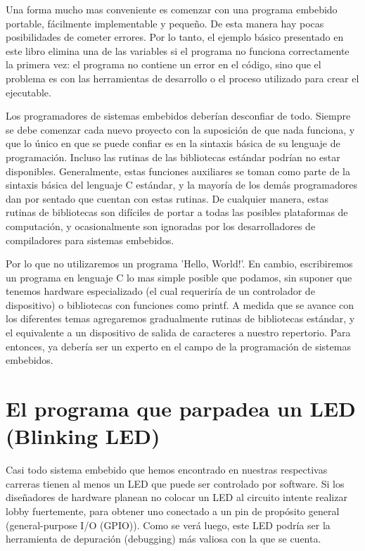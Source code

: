 \documentclass[output=paper, 
colorlinks,
citecolor=brown,
newtxmath
]{langscibook}
\begin{document}
Una forma mucho mas conveniente es comenzar con una programa embebido portable,
fácilmente implementable y pequeño. De esta manera hay pocas posibilidades de
cometer errores. Por lo tanto, el ejemplo básico presentado en este libro elimina
una de las variables si el programa no funciona correctamente la primera vez:
el programa no contiene un error en el código, sino que el problema es con las
herramientas de desarrollo o el proceso utilizado para crear el ejecutable.


Los programadores de sistemas embebidos deberían desconfiar de todo. Siempre se debe comenzar cada nuevo proyecto con la 
suposición de que nada funciona, y que lo único en que se puede confiar 
es en la sintaxis básica de su lenguaje de programación.
Incluso las rutinas de las bibliotecas estándar podrían no estar disponibles.
Generalmente, estas funciones auxiliares se toman como parte de la
sintaxis básica del lenguaje C estándar, y la mayoría de los demás programadores dan por sentado que cuentan con estas rutinas. De cualquier manera, 
estas rutinas de bibliotecas son difíciles de portar a todas las posibles
plataformas de computación, y ocasionalmente son ignoradas
por los desarrolladores de compiladores para sistemas embebidos.

Por lo que no utilizaremos un programa 'Hello, World!'. En cambio, escribiremos
un programa en lenguaje C lo mas simple posible que podamos, sin suponer
que tenemos hardware especializado (el cual requeriría de un controlador de dispositivo) o bibliotecas con funciones como printf.
A medida que se avance con los diferentes temas agregaremos gradualmente
rutinas de bibliotecas estándar, y el equivalente a un dispositivo de 
salida de caracteres a nuestro repertorio.
Para entonces, ya debería ser un experto en el campo de la programación de sistemas
embebidos.

\section {El programa que parpadea un LED (Blinking LED)}

Casi todo sistema embebido que hemos encontrado en nuestras respectivas
carreras tienen al menos un LED que puede ser controlado por software.
Si los diseñadores de hardware planean no colocar un LED al circuito intente
realizar lobby fuertemente, para obtener uno conectado a un pin de propósito
general (general-purpose I/O (GPIO)). Como se verá luego, este LED
podría ser la herramienta de depuración (debugging) más valiosa con la que
se cuenta.
\end{document}
